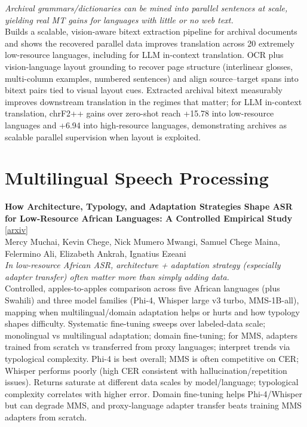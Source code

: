 \documentclass[12pt,letterpaper]{article}
\begin{document}
{\small\textit{Archival grammars/dictionaries can be mined into parallel sentences at scale, yielding real MT gains for languages with little or no web text.}}\\[1pt]
{\footnotesize Builds a scalable, vision-aware bitext extraction pipeline for archival documents and shows the recovered parallel data improves translation across 20 extremely low-resource languages, including for LLM in-context translation. OCR plus vision-language layout grounding to recover page structure (interlinear glosses, multi-column examples, numbered sentences) and align source--target spans into bitext pairs tied to visual layout cues. Extracted archival bitext measurably improves downstream translation in the regimes that matter; for LLM in-context translation, chrF2++ gains over zero-shot reach +15.78 into low-resource languages and +6.94 into high-resource languages, demonstrating archives as scalable parallel supervision when layout is exploited.}

\medskip


\section*{Multilingual Speech Processing}

{\small\textbf{How Architecture, Typology, and Adaptation Strategies Shape ASR for Low-Resource African Languages: A Controlled Empirical Study}} {\scriptsize[\href{https://arxiv.org/abs/2610.39004}{arxiv}]}\\
{\scriptsize Mercy Muchai, Kevin Chege, Nick Mumero Mwangi, Samuel Chege Maina, Felermino Ali, Elizabeth Ankrah, Ignatius Ezeani}\\

{\small\textit{In low-resource African ASR, architecture + adaptation strategy (especially adapter transfer) often matter more than simply adding data.}}\\[1pt]
{\footnotesize Controlled, apples-to-apples comparison across five African languages (plus Swahili) and three model families (Phi-4, Whisper large v3 turbo, MMS-1B-all), mapping when multilingual/domain adaptation helps or hurts and how typology shapes difficulty. Systematic fine-tuning sweeps over labeled-data scale; monolingual vs multilingual adaptation; domain fine-tuning; for MMS, adapters trained from scratch vs transferred from proxy languages; interpret trends via typological complexity. Phi-4 is best overall; MMS is often competitive on CER; Whisper performs poorly (high CER consistent with hallucination/repetition issues). Returns saturate at different data scales by model/language; typological complexity correlates with higher error. Domain fine-tuning helps Phi-4/Whisper but can degrade MMS, and proxy-language adapter transfer beats training MMS adapters from scratch.}
\end{document}
